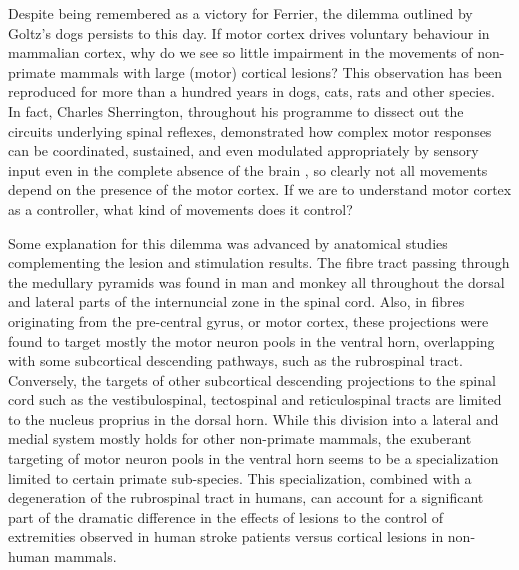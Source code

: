 Despite being remembered as a victory for Ferrier, the dilemma outlined by Goltz's dogs persists to this day. If motor cortex drives voluntary behaviour in mammalian cortex, why do we see so little impairment in the movements of non-primate mammals with large (motor) cortical lesions? This observation has been reproduced for more than a hundred years in dogs, cats, rats and other species. In fact, Charles Sherrington, throughout his programme to dissect out the circuits underlying spinal reflexes, demonstrated how complex motor responses can be coordinated, sustained, and even modulated appropriately by sensory input even in the complete absence of the brain \cite{Sherrington1906}, so clearly not all movements depend on the presence of the motor cortex. If we are to understand motor cortex as a controller, what kind of movements does it control?

Some explanation for this dilemma was advanced by anatomical studies complementing the lesion and stimulation results. The fibre tract passing through the medullary pyramids was found in man and monkey all throughout the dorsal and lateral parts of the internuncial zone in the spinal cord. Also, in fibres originating from the pre-central gyrus, or motor cortex, these projections were found to target mostly the motor neuron pools in the ventral horn, overlapping with some subcortical descending pathways, such as the rubrospinal tract. Conversely, the targets of other subcortical descending projections to the spinal cord such as the vestibulospinal, tectospinal and reticulospinal tracts are limited to the nucleus proprius in the dorsal horn. While this division into a lateral and medial system mostly holds for other non-primate mammals, the exuberant targeting of motor neuron pools in the ventral horn seems to be a specialization limited to certain primate sub-species. This specialization, combined with a degeneration of the rubrospinal tract in humans, can account for a significant part of the dramatic difference in the effects of lesions to the control of extremities observed in human stroke patients versus cortical lesions in non-human mammals.

